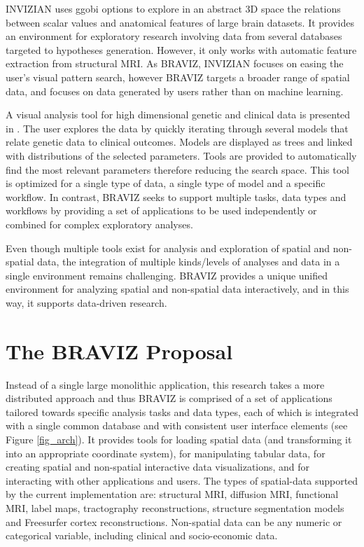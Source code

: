 \documentclass[twocolumn]{svjour3}
\begin{document}
INVIZIAN \cite{bowman_query-based_2011}\cite{bowman_feature-similarity_2012}\cite{bowman_visual_2012} uses ggobi options to explore in an abstract 3D space the relations between scalar values and anatomical features of large brain datasets. It provides an environment for exploratory research involving data from several databases targeted to hypotheses generation. However, it only works with automatic feature extraction from structural MRI. As BRAVIZ, INVIZIAN focuses on easing the user’s visual pattern search, however BRAVIZ targets a broader range of spatial data, and focuses on data generated by users rather than on machine learning. 


A visual analysis tool for high dimensional genetic and clinical data is presented in \cite{hinterberg_peax:_2014}. The user explores the data by quickly iterating through several models that relate genetic data to clinical outcomes. Models are displayed as trees and linked with distributions of the selected parameters. Tools are provided to automatically find the most relevant parameters therefore reducing the search space. This tool is optimized for a single type of data, a single type of model and a specific workflow. In contrast, BRAVIZ seeks to support multiple tasks, data types and workflows by providing a set of  applications to be used independently or combined for complex exploratory analyses.
	
Even though multiple tools  exist for analysis and exploration of spatial and non-spatial data, the integration of multiple kinds/levels of analyses and data in a single environment remains challenging. BRAVIZ provides a unique unified environment for analyzing spatial and non-spatial data interactively, and in this way, it supports data-driven research.

\section{The BRAVIZ Proposal}

Instead of a single large monolithic application, this research takes a more distributed approach and thus BRAVIZ is comprised of a set of applications tailored towards specific analysis tasks and data types, each of which is integrated with a single common database and with consistent user interface elements (see Figure \ref{fig_arch}). It provides tools for loading spatial data (and transforming it into an appropriate coordinate system), for manipulating tabular data, for creating spatial and non-spatial interactive data visualizations, and for interacting with other applications and users. The types of spatial-data supported by the current implementation are: structural MRI, diffusion MRI, functional MRI, label maps, tractography reconstructions, structure segmentation models and Freesurfer cortex reconstructions. Non-spatial data can be any numeric or categorical variable, including clinical and socio-economic data.
\end{document}
